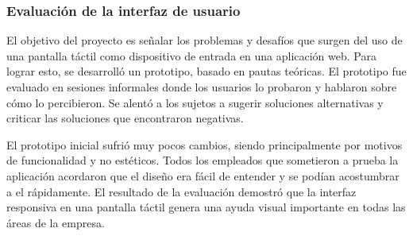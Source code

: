 \subsubsection{Evaluación de la interfaz de usuario}
El objetivo del proyecto es señalar los problemas y desafíos que surgen del uso de una pantalla táctil como dispositivo de entrada en una aplicación web. Para lograr esto, se desarrolló un prototipo, basado en pautas teóricas. El prototipo fue evaluado en sesiones informales donde los usuarios lo probaron y hablaron sobre cómo lo percibieron. Se alentó a los sujetos a sugerir soluciones alternativas y criticar las soluciones que encontraron negativas.
\vspace{0.8cm}

El prototipo inicial sufrió muy pocos cambios, siendo principalmente por motivos de funcionalidad y no estéticos. Todos los empleados que sometieron a prueba la aplicación acordaron que el diseño era fácil de entender y se podían acostumbrar a el rápidamente. El resultado de la evaluación demostró que la interfaz responsiva en una pantalla táctil genera una ayuda visual importante en todas las áreas de la empresa.